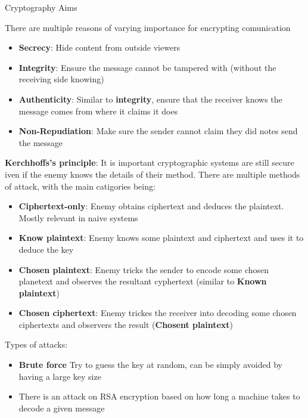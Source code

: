 \documentclass[12pt, letterpaper]{article}
\begin{document}
\begin{section}{Cryptography Aims}

  There are multiple reasons of varying importance for encrypting comunication
  \begin{itemize}
    \item \textbf{Secrecy}: Hide content from outside viewers
    \item \textbf{Integrity}: Ensure the message cannot be tampered with
          (without the receiving side knowing)
    \item \textbf{Authenticity}: Similar to \textbf{integrity}, ensure that the
          receiver knows the message comes from where it claims it does
    \item \textbf{Non-Repudiation}: Make sure the sender cannot claim they did
          notes send the message
  \end{itemize}

  \textbf{Kerchhoffs's principle}: It is important cryptographic systems are
  still secure iven if the enemy knows the details of their method.
  There are multiple methods of attack, with the main catigories being:
  \begin{itemize}
    \item \textbf{Ciphertext-only}: Enemy obtains ciphertext and deduces the
          plaintext. Mostly relevant in naive systems
    \item \textbf{Know plaintext}: Enemy knows some plaintext and ciphertext and
          uses it to deduce the key
    \item \textbf{Chosen plaintext}: Enemy tricks the sender to encode some
          chosen planetext and observes the resultant cyphertext (similar to
          \textbf{Known plaintext})
    \item \textbf{Chosen ciphertext}: Enemy trickes the receiver into decoding
          some chosen ciphertexts and observers the result (\textbf{Chosent
          plaintext})
    \end{itemize}

    Types of attacks:
    \begin{itemize}
      \item \textbf{Brute force} Try to guess the key at random, can be simply
            avoided by having a large key size
      \item There is an attack on RSA encryption based on how long a machine
            takes to decode a given message
    \end{itemize}

\end{section}
\end{document}
